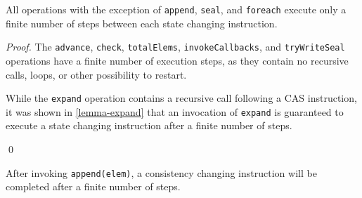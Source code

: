 \documentclass[runningheads,a4paper]{llncs}
\begin{document}

\begin{lemma}\label{lemma-finite-steps-state-change}
All operations with the exception of \verb=append=, \verb=seal=, and
\verb=foreach= execute only a finite number of steps between each state
changing instruction.
\end{lemma}

\begin{proof} The \verb=advance=, \verb=check=, \verb=totalElems=,
\verb=invokeCallbacks=, and \verb=tryWriteSeal= operations have a finite
number of execution steps, as they contain no recursive calls, loops, or other
possibility to restart.

While the \verb=expand= operation contains a recursive call following a CAS
instruction, it was shown in \ref{lemma-expand} that an invocation of
\verb=expand= is guaranteed to execute a state changing instruction after a
finite number of steps.

\qed
\end{proof}


\begin{lemma}[Append]\label{lemma-append}
After invoking \verb=append(elem)=, a consistency changing instruction will be
completed after a finite number of steps.
\end{lemma}
\end{document}
